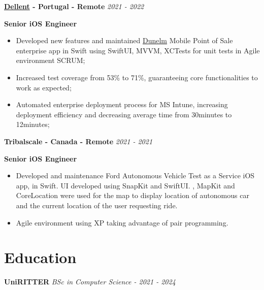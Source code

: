 \documentclass[11pt, oneside]{article}
\begin{document}
\textbf{\href{https://dellentconsulting.com}{Dellent} - Portugal - Remote}
\hfill
\textit{2021 - 2022}

\textbf{Senior iOS Engineer }

\begin{itemize}
    \item Developed new features and maintained \href{https://www.dunelm.com}{Dunelm} Mobile Point of Sale enterprise app in Swift using SwiftUI, MVVM, XCTests for unit tests in Agile environment SCRUM;
    \item Increased test coverage from 53\% to 71\%, guaranteeing core functionalities to work as expected;
    \item Automated enterprise deployment process for MS Intune, increasing deployment efficiency and decreasing average time from 30minutes to 12minutes;
\end{itemize}

\textbf{Tribalscale - Canada - Remote}
\hfill
\textit{2021 - 2021}

\textbf{Senior iOS Engineer}

\begin{itemize}
    \item Developed and maintenance Ford Autonomous Vehicle Test as a Service iOS app, in Swift. UI developed using SnapKit and SwiftUI. , MapKit and CoreLocation were used for the map to display location of autonomous car and the current location of the user requesting ride.
    \item Agile environment using XP taking advantage of pair programming.
\end{itemize}

\section*{Education}
\textbf{UniRITTER}
\hfill
\textit{BSc in Computer Science - 2021 - 2024}
\end{document}
